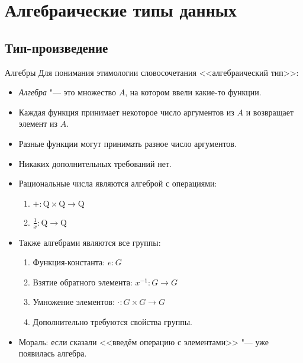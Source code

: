\section{Алгебраические типы данных}
\subsection{Тип-произведение}

\begin{frame}
\end{frame}

\begin{frame}{Алгебры}
	Для понимания этимологии словосочетания <<алгебраический тип>>:
	\begin{itemize}
		\item \textit{Алгебра} "--- это множество $A$, на котором ввели какие-то функции.
		\item Каждая функция принимает некоторое число аргументов из $A$ и возвращает элемент из $A$.
		\item Разные функции могут принимать разное число аргументов.
		\item Никаких дополнительных требований нет.
		\item Рациональные числа являются алгеброй с операциями:
			\begin{enumerate}
				\item $+ \colon \mathrm{Q} \times \mathrm{Q} \to \mathrm{Q}$
				\item $\frac{1}{x} \colon \mathrm{Q} \to \mathrm{Q}$
			\end{enumerate}
		\item Также алгебрами являются все группы:
			\begin{enumerate}
				\item Функция-константа: $e \colon G$
				\item Взятие обратного элемента: $x^{-1} \colon G \to G$
				\item Умножение элементов: $\cdot \colon G \times G \to G$
				\item Дополнительно требуются свойства группы.
			\end{enumerate}
		\item Мораль: если сказали <<введём операцию с элементами>> "--- уже появилась алгебра.
	\end{itemize}
\end{frame}

